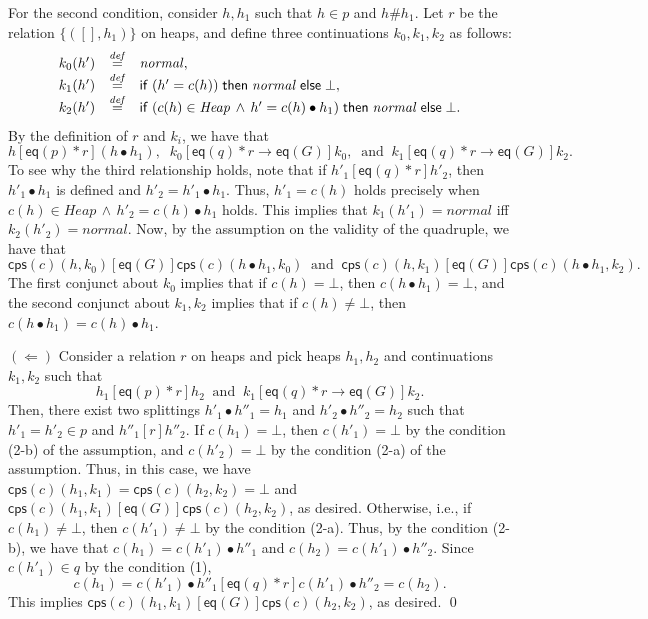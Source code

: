 \documentclass{LMCS}
\newcommand{\Heap}{\mathit{Heap}}
\newcommand{\Good}{\mathit{G}}
\newcommand{\normal}{\mathit{normal}}
\newcommand{\key}[1]{{\sf #1}}
\newcommand{\ifthenElse}[3]{\key{if}\; #1 \;\key{then}\; #2 \;\key{else}\; #3}
\newcommand{\EQ}{\mathsf{eq}}
\newcommand{\defeq}{\stackrel{\mathit{def}}{=}}
\newcommand{\cps}{\mathsf{cps}}
\begin{document}
For the second condition, consider $h,h_1$ such that 
$h \in p$ and $h \# h_1$. Let $r$ be the relation
$\{([],h_1)\}$ on heaps, and define three
continuations $k_0,k_1,k_2$ as follows:
$$
\begin{array}{rcl}
  k_0(h') & \defeq & \normal,
\\
  k_1(h') & \defeq & \ifthenElse{(h'=c(h))}{\normal}{\bot},
\\
  k_2(h') & \defeq & \ifthenElse{(c(h) \in \Heap \,\wedge\, h'=c(h)\bullet h_1)}{\normal}{\bot}.
\end{array}
$$
By the definition of $r$ and $k_i$, we have that
$$
   h[\EQ(p)*r](h\bullet h_1),\;\;
   k_0[\EQ(q)*r \rightarrow \EQ(\Good)]k_0,\;\;
   \mbox{and}\;\;
   k_1[\EQ(q)*r \rightarrow \EQ(\Good)]k_2.
$$
To see why the third relationship holds, note that if 
$h'_1[\EQ(q)*r]h'_2$, then $h'_1\bullet h_1$ is defined and
$h'_2 = h'_1 \bullet  h_1$. Thus, $h'_1 = c(h)$ holds precisely 
when $c(h) \in \Heap \,\wedge\, h'_2 = c(h)\bullet h_1$ holds. 
This implies that $k_1(h'_1) = \normal$ iff $k_2(h'_2) = \normal$.
Now, by the assumption on
the validity of the quadruple, we have that
$$
   \cps(c)(h,k_0)[\EQ(\Good)]\cps(c)(h\bullet h_1,k_0)
   \;\;\mbox{and}\;\;
   \cps(c)(h,k_1)[\EQ(\Good)]\cps(c)(h\bullet h_1,k_2).
$$
The first conjunct about $k_0$ implies that if
$c(h) = \bot$, then $c(h\bullet h_1) = \bot$, and the
second conjunct about $k_1,k_2$ implies that if
$c(h) \not= \bot$, then $c(h\bullet h_1) = c(h)\bullet h_1$.

$(\Leftarrow)$ Consider a relation $r$ on heaps and
pick heaps $h_1,h_2$ and continuations $k_1,k_2$ such that
$$
   h_1[\EQ(p)*r]h_2 \;\;\mbox{and}\;\;
   k_1[\EQ(q)*r \rightarrow \EQ(\Good)]k_2.
$$
Then, there exist two splittings $h'_1\bullet h''_1 = h_1$ and
$h'_2\bullet h''_2 = h_2$ such that $h'_1 = h'_2 \in p$ and
$h''_1[r]h''_2$. If $c(h_1) = \bot$, then $c(h'_1) = \bot$
by the condition (2-b) of the assumption, and 
$c(h'_2) = \bot$ by the condition (2-a) of the assumption.
Thus, in this case, we have 
$\cps(c)(h_1,k_1) = \cps(c)(h_2,k_2) = \bot$ and
$\cps(c)(h_1,k_1)[\EQ(\Good)]\cps(c)(h_2,k_2)$, as desired.
Otherwise, i.e., if $c(h_1) \not= \bot$, then $c(h'_1) \not=
\bot$ by the condition (2-a). Thus, by the condition (2-b),
we have that $c(h_1)  = c(h'_1) \bullet  h''_1$ and
$c(h_2)  = c(h'_1) \bullet  h''_2$. Since $c(h'_1) \in q$ by
the condition (1),  
$$
   c(h_1) = c(h'_1)\bullet h''_1[\EQ(q)*r]c(h'_1)\bullet h''_2 = c(h_2).
$$
This implies $\cps(c)(h_1,k_1)[\EQ(\Good)]\cps(c)(h_2,k_2)$,
as desired.
\qed
\end{document}
